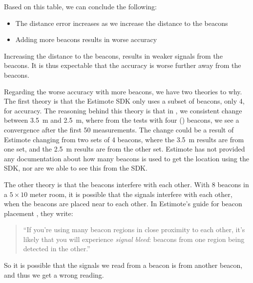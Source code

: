 Based on this table, we can conclude the following:
\begin{itemize}
  \item The distance error increases as we increase the distance to the beacons
  \item Adding more beacons results in worse accuracy
\end{itemize}

Increasing the distance to the beacons, 
results in weaker signals from the beacons. 
It is thus expectable that the accuracy is worse further away from the beacons. 

Regarding the worse accuracy with more beacons, 
we have two theories to why.
The first theory is that the Estimote SDK only uses a subset of beacons, \eg only \num{4}, for accuracy. 
The reasoning behind this theory is that in , 
we consistent change between \SI{3.5}{\meter} and \SI{2.5}{\meter}, 
where from the tests with four () beacons, 
we see a convergence after the first \num{50} measurements.
The change could be a result of Estimote changing from two sets of \num{4} beacons, 
where the \SI{3.5}{\meter} results are from one set, 
and the \SI{2.5}{\meter} results are from the other set. 
Estimote has not provided any documentation about how many beacons is used to get the location using the SDK, 
nor are we able to see this from the SDK. 

The other theory is that the beacons interfere with each other. 
With \num{8} beacons in a $5 \times 10$ meter room, 
it is possible that the signals interfere with each other, 
when the beacons are placed near to each other. 
In Estimote's guide for beacon placement \cite{SIGNALBLEED}, 
they write:
\begin{quote}
  ``If you’re using many beacon regions in close proximity to each other, it’s likely that you will experience \emph{signal bleed}: beacons from one region being detected in the other.''
\end{quote}
So it is possible that the signals we read from a beacon is from another beacon,
and thus we get a wrong reading. 

\FloatBarrier
